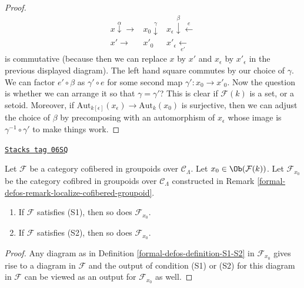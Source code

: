 \begin{proof}
$$
\begin{array}{ccc}x \overset{\alpha}{\downarrow}\longrightarrow & x_0 \overset{\gamma}{\downarrow} & x_\epsilon \overset{\beta}{\downarrow}\overset{e}{\longleftarrow} \\ x' \longrightarrow & x'_0 & x'_\epsilon \underset{e'}{\longleftarrow}\end{array}
$$
is commutative (because then we can replace $x$ by $x'$ and $x_\epsilon$
by $x'_\epsilon$ in the previous displayed diagram). The left hand square
commutes by our choice of $\gamma$. We can factor $e' \circ \beta$ as
$\gamma' \circ e$ for some second map
$\gamma' : x_0 \to x'_0$. Now the question is whether we can arrange it so
that $\gamma = \gamma'$? This is clear if $\mathcal{F}(k)$ is a set, or a
setoid. Moreover, if
$\text{Aut}_{k[\epsilon]}(x_\epsilon) \to \text{Aut}_k(x_0)$
is surjective, then we can adjust the choice of $\beta$ by precomposing
with an automorphism of $x_\epsilon$ whose image is
$\gamma^{-1} \circ \gamma'$ to make things work.
\end{proof}

\begin{lemma}[S1 S2 localize]
\label{formal-defos-lemma-S1-S2-localize}
\href{https://stacks.math.columbia.edu/tag/06SQ}{\texttt{Stacks tag 06SQ}}

Let $\mathcal{F}$ be a category cofibered in groupoids over
$\mathcal{C}_\Lambda$. Let $x_0 \in \Ob(\mathcal{F}(k))$.
Let $\mathcal{F}_{x_0}$ be the category cofibred in groupoids over
$\mathcal{C}_\Lambda$ constructed in
Remark \ref{formal-defos-remark-localize-cofibered-groupoid}.
\begin{enumerate}
\item If $\mathcal{F}$ satisfies (S1), then so does $\mathcal{F}_{x_0}$.
\item If $\mathcal{F}$ satisfies (S2), then so does $\mathcal{F}_{x_0}$.
\end{enumerate}
\end{lemma}

\begin{proof}
Any diagram as in
Definition \ref{formal-defos-definition-S1-S2}
in $\mathcal{F}_{x_0}$ gives rise to a diagram in $\mathcal{F}$
and the output of condition (S1) or (S2) for this diagram in $\mathcal{F}$
can be viewed as an output for $\mathcal{F}_{x_0}$ as well.
\end{proof}

